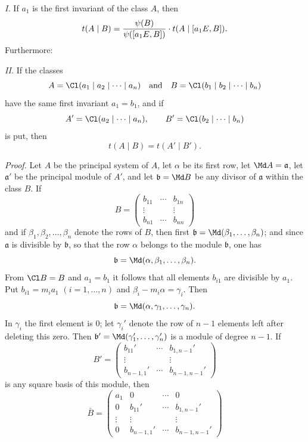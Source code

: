 \emph{I.} If $a_1$ is the first invariant of the class $A$, then
\[
 t(A\mid B)={\psi(B)\over\psi([a_1E,B])}\cdot t(A\mid [a_1E,B]).
\]
Furthermore:

\emph{II.} If the classes
\[
 A=\Cl(a_1\mid a_2\mid\cdots\mid a_n)
 \quad\text{and}\quad
 B=\Cl(b_1\mid b_2\mid\cdots\mid b_n)
\]
have the same first invariant $a_1=b_1$, and if
\[
 A'=\Cl(a_2\mid\cdots\mid a_n),
 \qquad
 B'=\Cl(b_2\mid\cdots\mid b_n)
\]
is put, then
\[
 t(A\mid B)=t(A'\mid B').
\]

\emph{Proof.} Let $A$ be the principal system of $A$, let $\alpha$ be its first row, let $\Md A=\mathfrak a$, let $\mathfrak a'$ be the principal module of $A'$, and let $\mathfrak b=\Md B$ be any divisor of $\mathfrak a$ within the class $B$. If
\[
 B=\begin{pmatrix}
 b_{11}&\cdots&b_{1n}\\
 \vdots&&\vdots\\
 b_{n1}&\cdots&b_{nn}
 \end{pmatrix}
\]
and if $\beta_1,\beta_2,\ldots,\beta_n$ denote the rows of $B$, then first $\mathfrak b=\Md(\beta_1,\ldots,\beta_n)$; and since $\mathfrak a$ is divisible by $\mathfrak b$, so that the row $\alpha$ belongs to the module $\mathfrak b$, one has
\[
 \mathfrak b=\Md(\alpha,\beta_1,\ldots,\beta_n).
\]
From $\Cl B=B$ and $a_1=b_1$ it follows that all elements $b_{i1}$ are divisible by $a_1$. Put $b_{i1}=m_i a_1$ $(i=1,\ldots,n)$ and $\beta_i-m_i\alpha=\gamma_i$. Then
\[
 \mathfrak b=\Md(\alpha,\gamma_1,\ldots,\gamma_n).
\]
In $\gamma_i$ the first element is $0$; let $\gamma_i'$ denote the row of $n-1$ elements left after deleting this zero. Then $\mathfrak b'=\Md(\gamma_1',\ldots,\gamma_n')$ is a module of degree $n-1$. If
\begin{equation}
 B'=\begin{pmatrix}
 b_{11}'&\cdots&b_{1,n-1}'\\
 \vdots&&\vdots\\
 b_{n-1,1}'&\cdots&b_{n-1,n-1}'
 \end{pmatrix}
\tag{3}
\end{equation}
is any square basis of this module, then
\begin{equation}
 \bar B=\begin{pmatrix}
 a_1&0&\cdots&0\\
 0&b_{11}'&\cdots&b_{1,n-1}'\\
 \vdots&\vdots&&\vdots\\
 0&b_{n-1,1}'&\cdots&b_{n-1,n-1}'
 \end{pmatrix}
\tag{4}
\end{equation}
